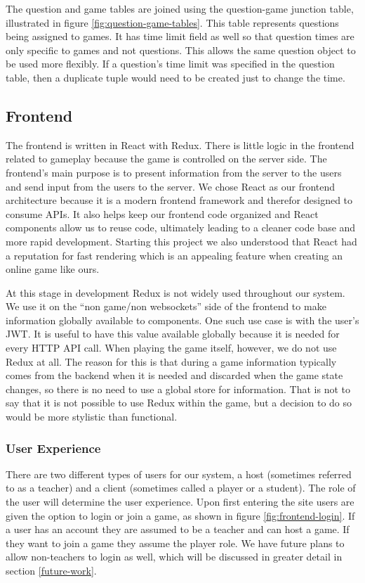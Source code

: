 \documentclass{article}
\begin{document}
    		The question and game tables are joined using the question-game junction table, illustrated in figure \ref{fig:question-game-tables}. This table represents questions being assigned to games. It has time limit field as well so that question times are only specific to games and not questions. This allows the same question object to be used more flexibly. If a question's time limit was specified in the question table, then a duplicate tuple would need to be created just to change the time.

	\subsection{Frontend}
	    The frontend is written in React with Redux. There is little logic in the frontend related to gameplay because the game is controlled on the server side. The frontend's main purpose is to present information from the server to the users and send input from the users to the server. We chose React as our frontend architecture because it is a modern frontend framework and therefor designed to consume APIs. It also helps keep our frontend code organized and React components allow us to reuse code, ultimately leading to a cleaner code base and more rapid development. Starting this project we also understood that React had a reputation for fast rendering which is an appealing feature when creating an online game like ours.
	    \smallskip
	    
	    At this stage in development Redux is not widely used throughout our system. We use it on the ``non game/non websockets'' side of the frontend to make information globally available to components. One such use case is with the user's JWT. It is useful to have this value available globally because it is needed for every HTTP API call. When playing the game itself, however, we do not use Redux at all. The reason for this is that during a game information typically comes from the backend when it is needed and discarded when the game state changes, so there is no need to use a global store for information. That is not to say that it is not possible to use Redux within the game, but a decision to do so would be more stylistic than functional.
	    
	    \subsubsection{User Experience} \label{ux}
	        There are two different types of users for our system, a host (sometimes referred to as a teacher) and a client (sometimes called a player or a student). The role of the user will determine the user experience. Upon first entering the site users are given the option to login or join a game, as shown in figure \ref{fig:frontend-login}. If a user has an account they are assumed to be a teacher and can host a game. If they want to join a game they assume the player role. We have future plans to allow non-teachers to login as well, which will be discussed in greater detail in section \ref{future-work}.
	        
\end{document}
